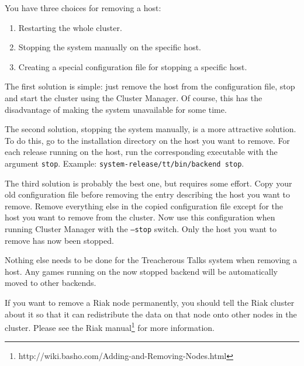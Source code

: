 \documentclass[11pt,a4paper]{report}
\begin{document}
You have three choices for removing a host:
\begin{enumerate}
  \item Restarting the whole cluster.
  \item Stopping the system manually on the specific host.
  \item Creating a special configuration file for stopping a specific host.
\end{enumerate}

The first solution is simple: just remove the host from the configuration file,
stop and start the cluster using the Cluster Manager. Of course, this has the
disadvantage of making the system unavailable for some time.

\begin{sloppypar}
The second solution, stopping the system manually, is a more attractive
solution. To do this, go to the installation directory on the host you want to
remove. For each release running on the host, run the corresponding executable
with the argument {\tt stop}. Example: {\tt system-release/tt/bin/backend
  stop}.
\end{sloppypar}

The third solution is probably the best one, but requires some effort. Copy your
old configuration file before removing the entry describing the host you want to
remove. Remove everything else in the copied configuration file except for the
host you want to remove from the cluster. Now use this configuration when
running Cluster Manager with the {\tt --stop} switch. Only the host you want to
remove has now been stopped.

Nothing else needs to be done for the Treacherous Talks system when removing a
host. Any games running on the now stopped backend will be automatically moved
to other backends.

If you want to remove a Riak node permanently, you should tell the Riak cluster
about it so that it can redistribute the data on that node onto other nodes in
the cluster. Please see the Riak manual\footnote{http://wiki.basho.com/Adding-and-Removing-Nodes.html}
for more information.
\end{document}
